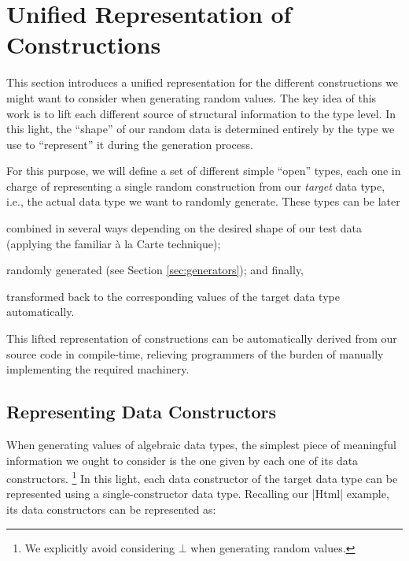 \section{Unified Representation of Constructions}
\label{sec:representation}

%
This section introduces a unified representation for the different constructions
we might want to consider when generating random values.
%
The key idea of this work is to lift each different source of structural
information to the type level.
%
In this light, the ``shape'' of our random data is determined entirely by the
type we use to ``represent'' it during the generation process.


For this purpose, we will define a set of different simple ``open'' types, each
one in charge of representing a single random construction from our
\emph{target} data type, i.e., the actual data type we want to randomly
generate.
%
These types can be later
%
\begin{inparaenum}[(i)]
\item combined in several ways depending on the desired shape of our test data
  (applying the familiar \`a la Carte technique);
\item randomly generated (see Section \ref{sec:generators}); and finally,
\item transformed back to the corresponding values of the target data type
  automatically.
\end{inparaenum}
%
This lifted representation of constructions can be automatically derived from
our source code in compile-time, relieving programmers of the burden of manually
implementing the required machinery.


%
\subsection{Representing Data Constructors}

When generating values of algebraic data types, the simplest piece of meaningful
information we ought to consider is the one given by each one of its data
constructors.
%
\footnote{We explicitly avoid considering $\bot$ when generating random values.}
%
In this light, each data constructor of the target data type can be represented
using a single-constructor data type.
%
Recalling our |Html| example, its data constructors can be represented as:
%

